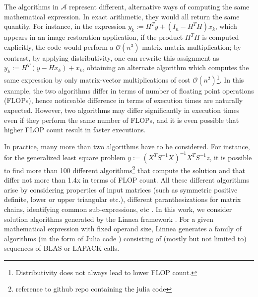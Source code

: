 \documentclass[conference]{IEEEtran}
\newcommand{\ar}[1]{{\color{red}#1}}
\begin{document}
The algorithms in $\mathcal{A}$ represent different, alternative ways of computing the same mathematical expression. In exact arithmetic, they would all return the same quantity.  For instance,  in the expression $y_k := H^{T}y + (I_n - H^{T}H)x_k$, which appears in an image restoration application\cite{tirer2018image}, if the product $H^TH$ is computed explicitly, the code would perform a $\mathcal{O}(n^3)$ matrix-matrix multiplication; by contrast, by applying distributivity, one can rewrite this assignment as $y_k := H^{T}(y - Hx_k) + x_k$, obtaining an alternate algorithm which computes the same expression by only matrix-vector multiplications of cost $\mathcal{O}(n^2)$\footnote{Distributivity does not always lead to lower FLOP count.}. In this example, the two algorithms differ in terms of number of floating point operations (FLOPs), hence noticeable difference in terms of execution times are naturally expected. However, two algorithms may differ significantly in execution times even if they perform the same number of FLOPs, and it is even possible that higher FLOP count result in faster executions\cite{barthels2019linnea}.


In practice, many more than two algorithms have to be considered.  For instance, for the generalized least square problem $y := (X^TS^{-1}X)^{-1}X^{T}S^{-1}z$, it is possible to find more than 100 different algorithms\footnote{\ar{reference to github repo containing the julia code}} that compute the solution and that differ not more than 1.4x in terms of FLOP count.  
All these different algorithms arise by considering properties of input matrices (such as symmetric positive definite, lower or upper triangular etc.), different paranthesizations for matrix chains, identifying common sub-expressions, etc \cite{psarras2019linear}. In this work, we consider solution algorithms generated by the Linnea framework \cite{barthels2019linnea}. For a given mathematical expression with fixed operand size, Linnea generates a family of algorithms (in the form of Julia code \cite{julia}) consisting of (mostly but not limited to) sequences of BLAS or LAPACK calls.
\end{document}
